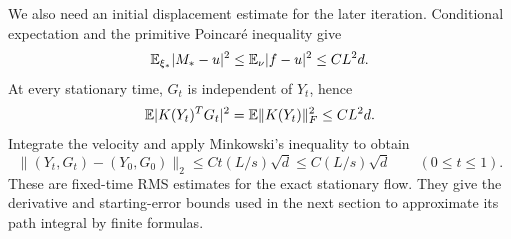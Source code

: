 We also need an initial displacement estimate for the later iteration.
Conditional expectation and the primitive Poincar\'e inequality give
\[
 \mathbb E_{\xi_*}|M_*-u|^2
 \le\mathbb E_\nu|f-u|^2\le CL^2d.
\]
At every stationary time, $G_t$ is independent of $Y_t$, hence
\[
 \mathbb E|K(Y_t)^TG_t|^2
   =\mathbb E\|K(Y_t)\|_F^2\le CL^2d.
\]
Integrate the velocity and apply Minkowski's inequality to obtain
\begin{equation}\label{eq:centering-initial-displacement}
 \|(Y_t,G_t)-(Y_0,G_0)\|_2
 \le Ct(L/s)\sqrt d\le C(L/s)\sqrt d
 \qquad(0\le t\le1).
\end{equation}
These are fixed-time RMS estimates for the exact stationary flow.
They give the derivative and starting-error bounds used in the next
section to approximate its path integral by finite formulas.
